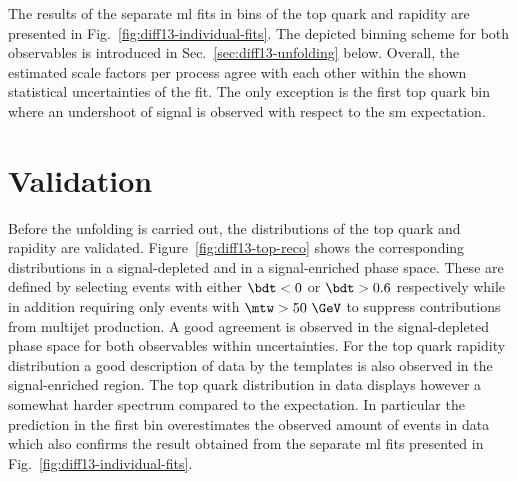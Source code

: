 The results of the separate \gls{ml} fits in bins of the top quark \pt and rapidity are presented in Fig.~\ref{fig:diff13-individual-fits}. The depicted binning scheme for both observables is introduced in Sec.~\ref{sec:diff13-unfolding} below. Overall, the estimated scale factors per process agree with each other within the shown statistical uncertainties of the fit. The only exception is the first top quark \pt bin where an undershoot of signal is observed with respect to the \gls{sm} expectation.



\section{Validation}

Before the unfolding is carried out, the distributions of the top quark \pt and rapidity are validated. Figure~\ref{fig:diff13-top-reco} shows the corresponding distributions in a signal-depleted and in a signal-enriched phase space. These are defined by selecting events with either $\bdt<0$ or $\bdt>0.6$ respectively while in addition requiring only events with $\mtw>50~\GeV$ to suppress contributions from multijet production. A good agreement is observed in the signal-depleted phase space for both observables within uncertainties. For the top quark rapidity distribution a good description of data by the templates is also observed in the signal-enriched region. The top quark \pt distribution in data displays however a somewhat harder spectrum compared to the expectation. In particular the prediction in the first \pt bin overestimates the observed amount of events in data which also confirms the result obtained from the separate \gls{ml} fits presented in Fig.~\ref{fig:diff13-individual-fits}.

